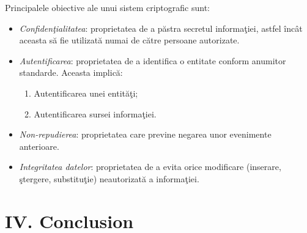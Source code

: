 \documentclass[11pt]{report}
\theoremstyle{plain}
\theoremstyle{definition}
\theoremstyle{definition}
\theoremstyle{proposition}
\begin{document}
Principalele obiective ale unui sistem criptografic sunt:
\begin{itemize}
	\item \textit{Confidenţialitatea}: proprietatea de a păstra secretul informaţiei, astfel încât aceasta să fie utilizată numai de către persoane autorizate.
	\item \textit{Autentificarea}: proprietatea de a identifica o entitate conform anumitor standarde. Aceasta implică:		
	\begin{enumerate}
		\item Autentificarea unei entităţi;
		\item Autentificarea sursei informaţiei.
	\end{enumerate}
	\item \textit{Non-repudierea}: proprietatea care previne negarea unor evenimente anterioare.
	\item \textit{Integritatea datelor}: proprietatea de a evita orice modificare (inserare, ştergere, substituţie) neautorizată a informaţiei.
\
\end{itemize}


\newpage

\chapter*{IV. Conclusion}

\nocite{*}



\end{document}
